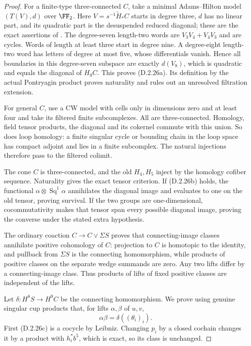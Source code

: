 \begin{proof}
For a finite-type three-connected $C$, take a minimal
Adams--Hilton model $(T(V),d)$ over $\FF_2$.
Here $V=s^{-1}\widetilde H_*C$ starts in degree three, $d$ has
no linear part, and its quadratic part is the desuspended reduced
diagonal; these are the exact assertions of
\cite[\S3.1, p.300]{FGHHalperinLemaire1995}.
The degree-seven length-two words are $V_3V_4+V_4V_3$ and are
cycles. Words of length at least three start in degree nine.
A degree-eight length-two word has letters of degree at most five,
whose differentials vanish. Hence all boundaries in this
degree-seven subspace are exactly $d(V_8)$, which is quadratic
and equals the diagonal of $H_9C$. This proves
\textup{(D.2.26a)}. Its definition by the actual Pontryagin product
proves naturality and rules out an unresolved filtration extension.

For general $C$, use a CW model with cells only in dimensions zero
and at least four and take its filtered finite subcomplexes.
All are three-connected. Homology, field tensor products, the
diagonal and its cokernel commute with this union. So does loop
homology: a finite singular cycle or bounding chain in the loop
space has compact adjoint and lies in a finite subcomplex.
The natural injections therefore pass to the filtered colimit.

The cone $C$ is three-connected, and the old $H_4,H_5$ inject
by the homology cofiber sequence. Naturality gives the exact tensor
criterion. If \textup{(D.2.26b)} holds, the functional
$\alpha\otimes\operatorname{Sq}^1\alpha$ annihilates the
diagonal image and evaluates to one on the old tensor, proving
survival. If the two groups are one-dimensional, cocommutativity
makes that tensor span every possible diagonal image, proving
the converse under the stated extra hypothesis.

The ordinary coaction $C\to C\vee\Sigma S$ proves that
connecting-image classes annihilate positive cohomology of $C$:
projection to $C$ is homotopic to the identity, and pullback from
$\Sigma S$ is the connecting homomorphism, while products of
positive classes on the separate wedge summands are zero.
Any two lifts differ by a connecting-image class. Thus products
of lifts of fixed positive classes are independent of the lifts.

Let $\delta:H^8S\to H^9C$ be the connecting homomorphism.
We prove using genuine singular cup products that, for lifts
$\alpha,\beta$ of $u,v$,
\[
 \alpha\beta=\delta((\theta_i)_i).
 \tag{D.2.26f}
\]
First \textup{(D.2.26c)} is a cocycle by Leibniz. Changing $p_i$
by a closed cochain changes it by a product with $h_i^*b^5$,
which is exact, so its class is unchanged.


\end{proof}
